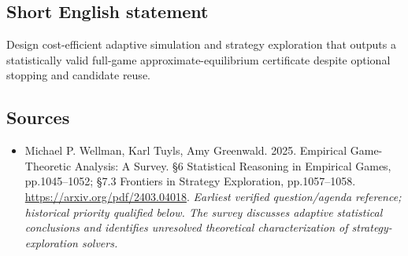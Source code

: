 \documentclass[11pt]{article}
\begin{document}
\subsection{Short English statement}
Design cost-efficient adaptive simulation and strategy exploration that outputs a statistically valid full-game approximate-equilibrium certificate despite optional stopping and candidate reuse.

\subsection{Sources}
\begin{itemize}\raggedright
\item[\textnormal{[S1]}]\hypertarget{source:30007570:1}{} Michael P. Wellman, Karl Tuyls, Amy Greenwald. 2025. Empirical Game-Theoretic Analysis: A Survey. §6 Statistical Reasoning in Empirical Games, pp.1045–1052; §7.3 Frontiers in Strategy Exploration, pp.1057–1058.
\url{https://arxiv.org/pdf/2403.04018}.
{\small\textit{Earliest verified question/agenda reference; historical priority qualified below. The survey discusses adaptive statistical conclusions and identifies unresolved theoretical characterization of strategy-exploration solvers.}}
\end{itemize}
\end{document}
